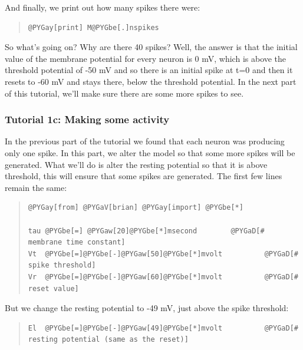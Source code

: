 \documentclass[letterpaper,10pt]{manual}
\begin{document}
And finally, we print out how many spikes there were:
\begin{quote}

\begin{Verbatim}[commandchars=@\[\]]
@PYGay[print] M@PYGbe[.]nspikes
\end{Verbatim}
\end{quote}

So what's going on? Why are there 40 spikes? Well, the answer is
that the initial value of the membrane potential for every neuron
is 0 mV, which is above the threshold potential of -50 mV and so there
is an initial spike at t=0 and then it resets to -60 mV and stays there,
below the threshold potential. In the next part of this tutorial, we'll
make sure there are some more spikes to see.

\resetcurrentobjects


\subsubsection{Tutorial 1c: Making some activity}

In the previous part of the tutorial we found that each neuron
was producing only one spike. In this part, we alter the model so
that some more spikes will be generated. What we'll do is alter
the resting potential  so that it is above threshold, this
will ensure that some spikes are generated. The first few
lines remain the same:
\begin{quote}

\begin{Verbatim}[commandchars=@\[\]]
@PYGay[from] @PYGaV[brian] @PYGay[import] @PYGbe[*]

tau @PYGbe[=] @PYGaw[20]@PYGbe[*]msecond        @PYGaD[# membrane time constant]
Vt  @PYGbe[=]@PYGbe[-]@PYGaw[50]@PYGbe[*]mvolt          @PYGaD[# spike threshold]
Vr  @PYGbe[=]@PYGbe[-]@PYGaw[60]@PYGbe[*]mvolt          @PYGaD[# reset value]
\end{Verbatim}
\end{quote}

But we change the resting potential to -49 mV, just above the
spike threshold:
\begin{quote}

\begin{Verbatim}[commandchars=@\[\]]
El  @PYGbe[=]@PYGbe[-]@PYGaw[49]@PYGbe[*]mvolt          @PYGaD[# resting potential (same as the reset)]
\end{Verbatim}
\end{quote}
\end{document}
